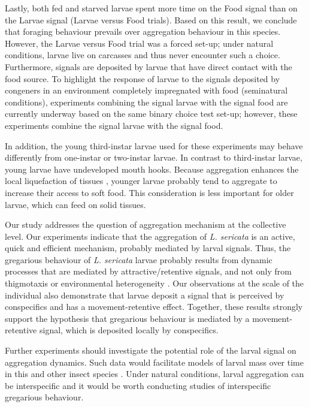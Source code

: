 Lastly, both fed and starved larvae spent more time on the Food signal than on the Larvae signal (Larvae versus Food trials). Based on this result, we conclude that foraging behaviour prevails over aggregation behaviour in this species. However, the Larvae versus Food trial was a forced set-up; under natural conditions, larvae live on carcasses and thus never encounter such a choice. Furthermore, signals are deposited by larvae that have direct contact with the food source. To highlight the response of larvae to the signals deposited by congeners in an environment completely impregnated with food (seminatural conditions), experiments combining the signal larvae with the signal food are currently underway based on the same binary choice test set-up; however, these experiments combine the signal larvae with the signal food.

In addition, the young third-instar larvae used for these experiments may behave differently from one-instar or two-instar larvae. In contrast to third-instar larvae, young larvae have undeveloped mouth hooks. Because aggregation enhances the local liquefaction of tissues \citep{hobson_studies_1932}, younger larvae probably tend to aggregate to increase their access to soft food. This consideration is less important for older larvae, which can feed on solid tissues.

Our study addresses the question of aggregation mechanism at the collective level. Our experiments indicate that the aggregation of \textit{L. sericata} is an active, quick and efficient mechanism, probably mediated by larval signals. Thus, the gregarious behaviour of \textit{L. sericata} larvae probably results from dynamic processes that are mediated by attractive/retentive signals, and not only from thigmotaxis or environmental heterogeneity \citep{devigne_individual_2011, mailleux_collective_2011, broly_aggregation_2012}. Our observations at the scale of the individual also demonstrate that larvae deposit a signal that is perceived by conspecifics and has a movement-retentive effect. Together, these results strongly support the hypothesis that gregarious behaviour is mediated by a movement-retentive signal, which is deposited locally by conspecifics.

Further experiments should investigate the potential role of the larval signal on aggregation dynamics. Such data would facilitate models of larval mass over time in this and other insect species \citep{farine_gregarisme_1984, rivault_cockroach_1998, depickere_effect_2008}. Under natural conditions, larval aggregation can be interspecific \citep{amendt_current_2010} and it would be worth conducting studies of interspecific gregarious behaviour.


